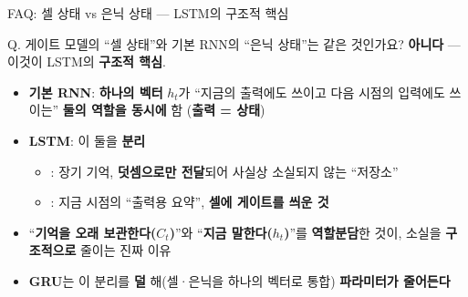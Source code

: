 \begin{frame}{FAQ: 셀 상태 vs 은닉 상태 --- LSTM의 구조적 핵심}
  \begin{block}{Q. 게이트 모델의 ``셀 상태''와 기본 RNN의 ``은닉
  상태''는 같은 것인가요?}
    \textbf{아니다} --- 이것이 LSTM의 \textbf{구조적 핵심}.
    \begin{itemize}
      \item \textbf{기본 RNN}: \textbf{하나의 벡터} $h_t$가
        ``지금의 출력에도 쓰이고 다음 시점의 입력에도 쓰이는''
        \textbf{둘의 역할을 동시에} 함 (\textbf{출력 = 상태})
      \item \textbf{LSTM}: 이 둘을 \textbf{분리}
      \begin{itemize}
        \item {}: 장기 기억, \textbf{덧셈으로만
          전달}되어 사실상 소실되지 않는 ``저장소''
        \item {}: 지금 시점의 ``출력용 요약'',
          \textbf{셀에 게이트를 씌운 것}
      \end{itemize}
      \item ``\textbf{기억을 오래 보관한다($C_t$)}''와
        ``\textbf{지금 말한다($h_t$)}''를 \textbf{역할분담}한 것이,
        소실을 \textbf{구조적으로} 줄이는 진짜 이유
      \item \textbf{GRU}는 이 분리를 \textbf{덜} 해(셀·은닉을
        하나의 벡터로 통합) \textbf{파라미터가 줄어든다}
    \end{itemize}
  \end{block}
\end{frame}
